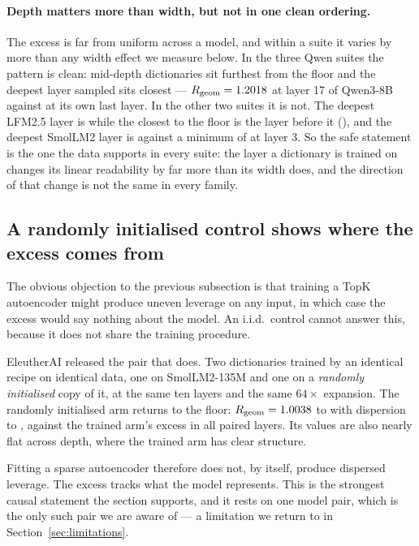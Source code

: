 \paragraph{Depth matters more than width, but not in one clean ordering.} The excess is far from
uniform across a model, and within a suite it varies by more than any width effect we measure below.
In the three Qwen suites the pattern is clean: mid-depth dictionaries sit furthest from the floor and
the deepest layer sampled sits closest --- $R_{\mathrm{geom}}=1.2018{}$ at layer 17 of Qwen3-8B
against \SaeQwenDeepestRgeom{} at its own last layer. In the other two suites it is not. The deepest
LFM2.5 layer is \SaeLfmDeepestRgeom{} while the closest to the floor is the layer before it
(\SaeLfmClosestRgeom{}), and the deepest SmolLM2 layer is \SaeSmolDeepestRgeom{} against a minimum of
\SaeSmolClosestRgeom{} at layer 3. So the safe statement is the one the data supports in every
suite: the layer a dictionary is trained on changes its linear readability by far more than its
width does, and the direction of that change is not the same in every family.

\subsection{A randomly initialised control shows where the excess comes from}

The obvious objection to the previous subsection is that training a TopK autoencoder might produce
uneven leverage on any input, in which case the excess would say nothing about the model. An i.i.d.\
control cannot answer this, because it does not share the training procedure.

EleutherAI released the pair that does. Two dictionaries trained by an identical recipe on identical
data, one on SmolLM2-135M and one on a \emph{randomly initialised} copy of it, at the same ten layers
and the same $64\times$ expansion. The randomly initialised arm returns to the floor:
$R_{\mathrm{geom}}=1.0038$ to \SaeRandInitRgeomMax{} with dispersion \SaeRandInitCvMin{} to
\SaeRandInitCvMax{}, against the trained arm's excess in all \SaePairedLayers{} paired layers. Its
values are also nearly flat across depth, where the trained arm has clear structure.

Fitting a sparse autoencoder therefore does not, by itself, produce dispersed leverage. The excess
tracks what the model represents. This is the strongest causal statement the section supports, and it
rests on one model pair, which is the only such pair we are aware of --- a limitation we return to in
Section~\ref{sec:limitations}.

